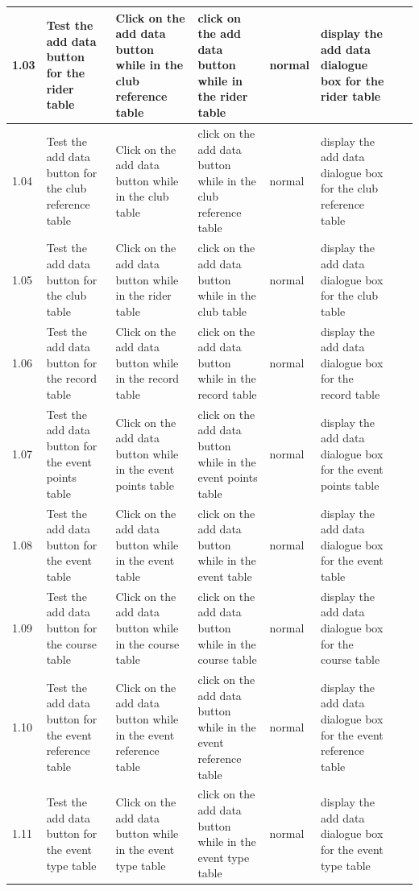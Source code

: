 \begin{landscape}
\begin{center}
\begin{longtable}{|p{1.5cm}|p{2.5cm}|p{2.5cm}|p{2cm}|p{2cm}|p{2cm}|p{2cm}|p{2cm}|}
        1.03 & Test the add data button for the rider table & Click on the add data button while in the club reference table & click on the add data button while in the rider table & normal & display the add data dialogue box for the rider table & & \\ \hline
        1.04 & Test the add data button for the club reference table & Click on the add data button while in the club table & click on the add data button while in the club reference table & normal & display the add data dialogue box for the club reference table & & \\ \hline
        1.05 & Test the add data button for the club  table & Click on the add data button while in the rider table & click on the add data button while in the club table & normal & display the add data dialogue box for the club  table & & \\ \hline
        1.06 & Test the add data button for the record  table & Click on the add data button while in the record table & click on the add data button while in the record table & normal & display the add data dialogue box for the record  table & & \\ \hline
        1.07 & Test the add data button for the event points  table & Click on the add data button while in the event points table & click on the add data button while in the event points table & normal & display the add data dialogue box for the event points  table & & \\ \hline
        1.08 & Test the add data button for the event  table & Click on the add data button while in the event table & click on the add data button while in the event table & normal & display the add data dialogue box for the event  table & & \\ \hline
        1.09 & Test the add data button for the course  table & Click on the add data button while in the course table & click on the add data button while in the course table & normal & display the add data dialogue box for the course  table & & \\ \hline
        1.10 & Test the add data button for the event reference  table & Click on the add data button while in the event reference table & click on the add data button while in the event reference table & normal & display the add data dialogue box for the event reference  table & & \\ \hline
        1.11 & Test the add data button for the event type  table & Click on the add data button while in the event type table & click on the add data button while in the event type table & normal & display the add data dialogue box for the event type  table & & \\ \hline
        

\end{longtable}
\end{center}
\end{landscape}
